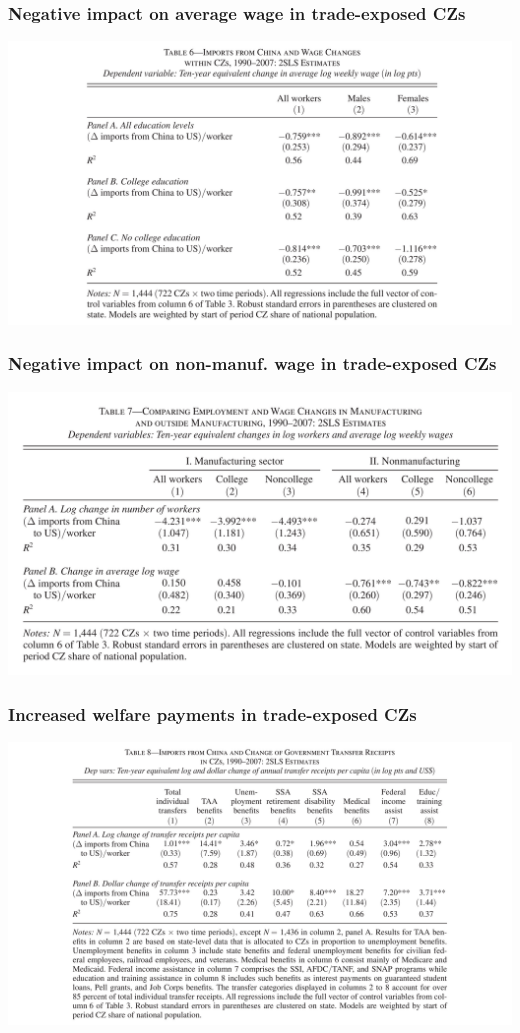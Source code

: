 \documentclass[notes=show]{beamer}
\begin{document}
\begin{frame}
\frametitle{Negative impact on average wage in trade-exposed CZs}
\begin{center}
\includegraphics[width=\textwidth]{table-6.pdf}%
\end{center}
\end{frame}

\begin{frame}
\frametitle{Negative impact on non-manuf. wage in trade-exposed CZs}
\begin{center}
\includegraphics[width=\textwidth]{table-7.pdf}%
\end{center}
\end{frame}

\begin{frame}
\frametitle{Increased welfare payments in trade-exposed CZs}
\begin{center}
\includegraphics[width=\textwidth]{table-8.pdf}%
\end{center}
\end{frame}
\end{document}
